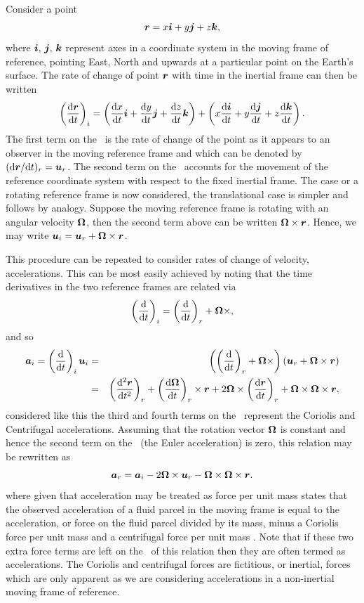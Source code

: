 Consider a point
\begin{equation*}
{\mbox{\boldmath$r$}} = x{\mbox{\boldmath$i$}} + y{\mbox{\boldmath$j$}} + z{\mbox{\boldmath$k$}},
\end{equation*}
where ${\mbox{\boldmath$i$}},\,{\mbox{\boldmath$j$}},\,{\mbox{\boldmath$k$}}$ represent axes in a coordinate system in the moving frame of
reference, \eg pointing East, North and upwards at a particular point on the Earth's surface.
The rate of change of point ${\mbox{\boldmath$r$}}$ with time in the inertial frame can then be written
\begin{equation*}
\left(\frac{\mathrm{d}{\mbox{\boldmath$r$}}}{\mathrm{d} t}\right)_i=\left(\frac{\mathrm{d} x}{\mathrm{d} t}{\mbox{\boldmath$i$}}+\frac{\mathrm{d} y}{\mathrm{d} t}{\mbox{\boldmath$j$}}+\frac{\mathrm{d} z}{\mathrm{d} t}{\mbox{\boldmath$k$}}\right)
+\left(x\frac{\mathrm{d}{\mbox{\boldmath$i$}}}{\mathrm{d} t}+y\frac{\mathrm{d}{\mbox{\boldmath$j$}}}{\mathrm{d} t}+z\frac{\mathrm{d}{\mbox{\boldmath$k$}}}{\mathrm{d} t}\right).
\end{equation*}
The first term on the \rhs\ is the rate of change of the point as it appears
to an observer in the moving reference frame and which can be denoted by
$(\mathrm{d}{\mbox{\boldmath$r$}}/\mathrm{d} t)_r={\mbox{\boldmath$u$}}_r$.
The second term on the \rhs\ accounts for the movement of the reference coordinate system
with respect to the fixed inertial frame. The case or a rotating reference frame is now considered,
the translational case is simpler and follows by analogy. Suppose the moving reference frame is
rotating with an angular velocity ${\mbox{\boldmath$\Omega$}}$, then the second term above can be written ${\mbox{\boldmath$\Omega$}}\times{\mbox{\boldmath$r$}}$.
Hence, we may write ${\mbox{\boldmath$u$}}_i={\mbox{\boldmath$u$}}_r+{\mbox{\boldmath$\Omega$}}\times{\mbox{\boldmath$r$}}$.

This procedure can be repeated to consider rates of change of velocity, \ie accelerations. This can be most
easily achieved by noting that the time derivatives in the two reference frames are related via
\begin{equation*}
\left(\frac{\mathrm{d}}{\mathrm{d} t}\right)_i=\left(\frac{\mathrm{d}}{\mathrm{d} t}\right)_r + {\mbox{\boldmath$\Omega$}}\times,
\end{equation*}
and so 
\begin{eqnarray*}
{\mbox{\boldmath$a$}}_i=\left(\frac{\mathrm{d}}{\mathrm{d} t}\right)_i{\mbox{\boldmath$u$}}_i &=& \left(\left(\frac{\mathrm{d}}{\mathrm{d} t}\right)_r + {\mbox{\boldmath$\Omega$}}\times\right)\left({\mbox{\boldmath$u$}}_r+{\mbox{\boldmath$\Omega$}}\times{\mbox{\boldmath$r$}}\right)\\
&=&\left(\frac{\mathrm{d}^2{\mbox{\boldmath$r$}}}{\mathrm{d} t^2}\right)_r + \left(\frac{\mathrm{d}{\mbox{\boldmath$\Omega$}}}{\mathrm{d} t}\right)_r\times{\mbox{\boldmath$r$}} + 2{\mbox{\boldmath$\Omega$}}\times\left(\frac{\mathrm{d}{\mbox{\boldmath$r$}}}{\mathrm{d} t}\right)_r + {\mbox{\boldmath$\Omega$}}\times{\mbox{\boldmath$\Omega$}}\times{\mbox{\boldmath$r$}},
\end{eqnarray*}
considered like this the third and fourth terms on the \rhs\ represent the Coriolis and Centrifugal accelerations.
Assuming that the rotation vector ${\mbox{\boldmath$\Omega$}}$ is constant and hence the second term on the \rhs\ (the Euler acceleration) 
is zero, this relation may be rewritten as
\begin{equation*}
{\mbox{\boldmath$a$}}_r = {\mbox{\boldmath$a$}}_i - 2{\mbox{\boldmath$\Omega$}}\times{\mbox{\boldmath$u$}}_r - {\mbox{\boldmath$\Omega$}}\times{\mbox{\boldmath$\Omega$}}\times{\mbox{\boldmath$r$}}.
\end{equation*}
where given that acceleration may be treated as force per unit mass states that the observed acceleration of a fluid parcel in the moving frame
is equal to the acceleration, or force on the fluid parcel divided by its mass, minus a Coriolis force per unit mass and a centrifugal force per unit mass \citep[chap. 2]{vallis2006}. Note that if these two extra force terms are left on the \lhs\ of this relation then they are often termed as accelerations.
The Coriolis and centrifugal forces are fictitious, or inertial, forces which are only apparent as we are considering accelerations in a non-inertial
moving frame of reference.

